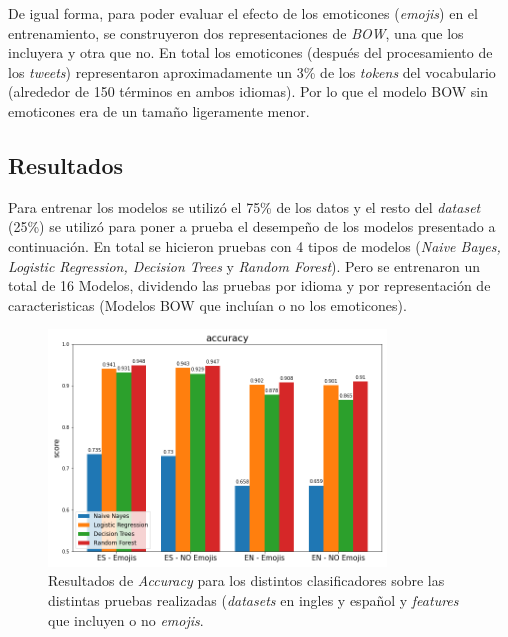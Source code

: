 De igual forma, para poder evaluar el efecto de los emoticones (\textit{emojis}) en el entrenamiento, se construyeron dos representaciones de \textit{BOW}, una que los incluyera y otra que no. En total los emoticones (después del procesamiento de los \textit{tweets}) representaron aproximadamente un 3\% de los \textit{tokens} del vocabulario (alrededor de 150 términos en ambos idiomas). Por lo que el modelo BOW sin emoticones era de un tamaño ligeramente menor.

\subsection{Resultados}

Para entrenar los modelos se utilizó el 75\% de los datos y el resto del \textit{dataset} (25\%) se utilizó para poner a prueba el desempeño de los modelos presentado a continuación. En total se hicieron pruebas con 4 tipos de modelos (\textit{Naive Bayes, Logistic Regression, Decision Trees} y \textit{Random Forest}). Pero se entrenaron un total de 16 Modelos, dividendo las pruebas por idioma y por representación de caracteristicas (Modelos BOW que incluían o no los emoticones).

\begin{figure}[H]
    \centering
    \includegraphics[width=0.8\textwidth]{results/mourning_tweets_accuracy.png}
    \caption{Resultados de \textit{Accuracy} para los distintos clasificadores sobre las distintas pruebas realizadas (\textit{datasets} en ingles y español y \textit{features} que incluyen o no \textit{emojis}.}
    \label{fig:mt_acc}
\end{figure}


